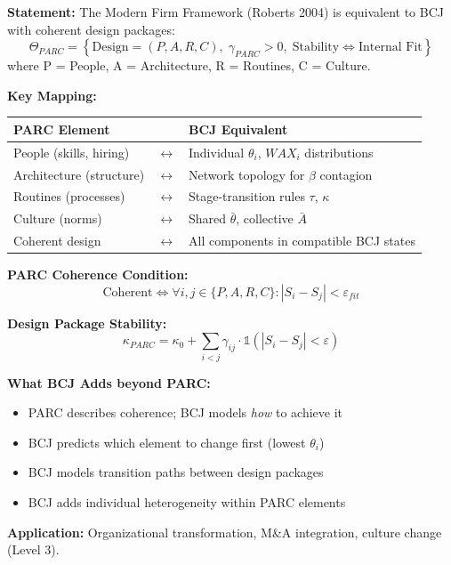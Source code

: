 \begin{tcolorbox}[colback=green!5!white, colframe=green!75!black,
    title=Theorem BCJ-T35: John Roberts PARC / Modern Firm as Special Case]
\textbf{Statement:} The Modern Firm Framework (Roberts 2004) is equivalent to BCJ with coherent design packages:
\begin{equation}
\Theta_{PARC} = \left\{\text{Design} = (P, A, R, C), \; \gamma_{PARC} > 0, \; \text{Stability} \Leftrightarrow \text{Internal Fit}\right\}
\end{equation}
where P = People, A = Architecture, R = Routines, C = Culture.

\textbf{Key Mapping:}
\begin{center}
\begin{tabular}{lcl}
\toprule
\textbf{PARC Element} & & \textbf{BCJ Equivalent} \\
\midrule
People (skills, hiring) & $\leftrightarrow$ & Individual $\theta_i$, $WAX_i$ distributions \\
Architecture (structure) & $\leftrightarrow$ & Network topology for $\beta$ contagion \\
Routines (processes) & $\leftrightarrow$ & Stage-transition rules $\tau$, $\kappa$ \\
Culture (norms) & $\leftrightarrow$ & Shared $\bar{\theta}$, collective $\bar{A}$ \\
Coherent design & $\leftrightarrow$ & All components in compatible BCJ states \\
\bottomrule
\end{tabular}
\end{center}

\textbf{PARC Coherence Condition:}
\begin{equation}
\text{Coherent} \Leftrightarrow \forall i,j \in \{P,A,R,C\}: |S_i - S_j| < \varepsilon_{fit}
\end{equation}

\textbf{Design Package Stability:}
\begin{equation}
\kappa_{PARC} = \kappa_0 + \sum_{i<j} \gamma_{ij} \cdot \mathbb{1}(|S_i - S_j| < \varepsilon)
\end{equation}

\textbf{What BCJ Adds beyond PARC:}
\begin{itemize}[nosep]
\item PARC describes coherence; BCJ models \textit{how} to achieve it
\item BCJ predicts which element to change first (lowest $\theta_i$)
\item BCJ models transition paths between design packages
\item BCJ adds individual heterogeneity within PARC elements
\end{itemize}

\textbf{Application:} Organizational transformation, M\&A integration, culture change (Level 3).
\end{tcolorbox}

